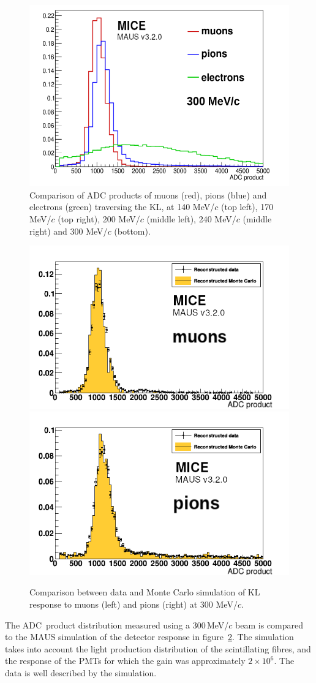 \begin{figure}
\begin{center}
    \includegraphics[width=0.45\columnwidth]{./04-KL/Figures/mu_vs_pi_vs_e_300MEV-edited.png}
  \end{center}
  \caption{
    Comparison of ADC products of muons (red), pions (blue) and electrons (green) traversing the KL, at 140
    MeV/$c$ (top left), 170 MeV/$c$ (top right), 200 MeV/$c$ (middle
    left), 240 MeV/$c$ (middle right) and 300 MeV/$c$ (bottom).
  }
  \label{fig:KL4}
\end{figure}
\begin{figure}
  \begin{center}
    \includegraphics[width=0.49\columnwidth]{./04-KL/Figures/muon_mc_vs_data_edited.png}
    \includegraphics[width=0.49\columnwidth]{./04-KL/Figures/pion_mc_vs_data_edited.png}
  \end{center}
  \caption{
    Comparison between data and Monte Carlo simulation of KL response
    to muons (left) and pions (right) at 300 MeV/$c$.
  } 
  \label{fig:KL_mc_vs_data}
\end{figure}

The ADC~product distribution measured using a 300\,MeV/$c$ beam is
compared to the MAUS simulation of the detector response in
figure~\ref{fig:KL_mc_vs_data}.
The simulation takes into account the light production distribution of the
scintillating fibres, and the response of the PMTs for which the gain was
approximately $2 \times 10^6$. 
The data is well described by the simulation.
